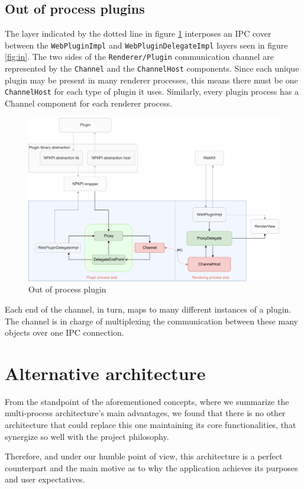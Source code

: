 \subsection{Out of process plugins}

The layer indicated by the dotted line in figure \ref{fig:out} interposes an IPC cover between the \texttt{WebPluginImpl} and \texttt{WebPluginDelegateImpl} layers seen in figure \ref{fig:in}. The two sides of the \texttt{Renderer/Plugin} communication channel are represented by the \texttt{Channel} and the \texttt{ChannelHost} components. Since each unique plugin may be present in many renderer processes, this means there must be one \texttt{ChannelHost} for each type of plugin it uses. Similarly, every plugin process has a Channel component for each renderer process.

\begin{figure}[H]
    \centering
    \includegraphics[width=\textwidth]{img/chromium-out.png}
    \caption{Out of process plugin}
    \label{fig:out}
\end{figure}

Each end of the channel, in turn, maps to many different instances of a plugin. The channel is in charge of multiplexing the communication between these many objects over one IPC connection.


\section{Alternative architecture}

From the standpoint of the aforementioned concepts, where we summarize the multi-process architecture's main advantages, we found that there is no other architecture that could replace this one maintaining its core functionalities, that synergize so well with the project philosophy.

Therefore, and under our humble point of view, this architecture is a perfect counterpart and the main motive as to why the application achieves its purposes and user expectatives.